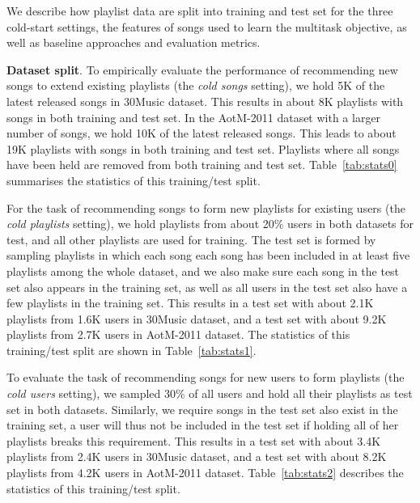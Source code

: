 We describe how playlist data are split into training and test set for the three cold-start settings,
the features of songs used to learn the multitask objective, as well as baseline approaches and evaluation metrics.

{\bf Dataset split}.
To empirically evaluate the performance of recommending new songs to extend existing playlists (\ie the \emph{cold songs} setting),
we hold 5K of the latest released songs in 30Music dataset. This results in about 8K playlists with songs
in both training and test set.
In the AotM-2011 dataset with a larger number of songs, we hold 10K of the latest released songs.
This leads to about 19K playlists with songs in both training and test set.
Playlists where all songs have been held are removed from both training and test set.
Table~\ref{tab:stats0} summarises the statistics of this training/test split.

For the task of recommending songs to form new playlists for existing users (\ie the \emph{cold playlists} setting),
we hold playlists from about 20\% users in both datasets for test, and all other playlists are used for training.
The test set is formed by sampling playlists in which each song each song has been included in at least five playlists among the whole dataset,
and we also make sure each song in the test set also appears in the training set,
as well as all users in the test set also have a few playlists in the training set.
This results in a test set with about 2.1K playlists from 1.6K users in 30Music dataset,
and a test set with about 9.2K playlists from 2.7K users in AotM-2011 dataset.
The statistics of this training/test split are shown in Table~\ref{tab:stats1}.

To evaluate the task of recommending songs for new users to form playlists (\ie the \emph{cold users} setting),
we sampled 30\% of all users and hold all their playlists as test set in both datasets.
Similarly, we require songs in the test set also exist in the training set,
a user will thus not be included in the test set if holding all of her playlists breaks this requirement.
This results in a test set with about 3.4K playlists from 2.4K users in 30Music dataset,
and a test set with about 8.2K playlists from 4.2K users in AotM-2011 dataset.
Table~\ref{tab:stats2} describes the statistics of this training/test split.


